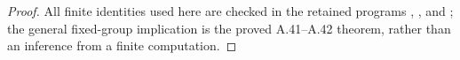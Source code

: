 \begin{proof}
All finite identities used here are checked in the retained programs
,
, and
; the general
fixed-group implication is the proved A.41--A.42 theorem, rather than
an inference from a finite computation.
\end{proof}
